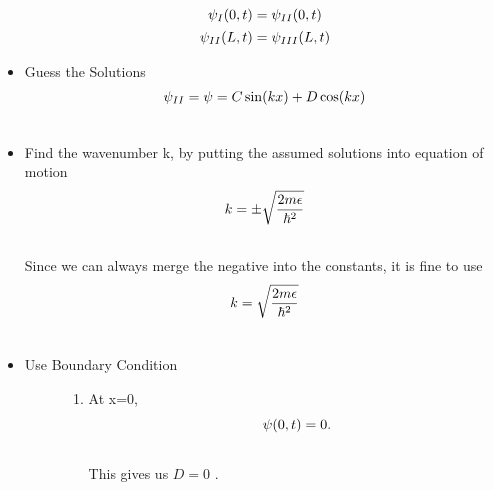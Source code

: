 \documentclass[letterpaper,10pt,english]{sphinxmanual}
\begin{document}
\begin{itemize}
\begin{gather}
\begin{split}\psi _ I(0,t) = \psi _ {II}(0,t)\end{split}\notag\\\begin{split}\psi _ {II}(L, t) = \psi _ {III}(L, t)\end{split}\notag
\end{gather}
\item {} 
Guess the Solutions
\begin{gather}
\begin{split}\psi_{II} = \psi = C \sin (k x) + D \cos(kx)\end{split}\notag\\\begin{split}\end{split}\notag
\end{gather}
\item {} 
Find the wavenumber k, by putting the assumed solutions into equation of motion
\begin{gather}
\begin{split}k = \pm \sqrt{\frac{2m \epsilon}{\hbar^2} }\end{split}\notag\\\begin{split}\end{split}\notag
\end{gather}
Since we can always merge the negative into the constants, it is fine to use
\begin{gather}
\begin{split}k = \sqrt{\frac{2m \epsilon}{\hbar^2} }\end{split}\notag\\\begin{split}\end{split}\notag
\end{gather}
\item {} \begin{description}
\item[{Use Boundary Condition}] \leavevmode\begin{enumerate}
\item {} 
At x=0,
\begin{gather}
\begin{split}\psi(0,t)=0 .\end{split}\notag\\\begin{split}\end{split}\notag
\end{gather}
This gives us $D = 0$ .


\end{enumerate}
\end{description}
\end{itemize}
\end{document}

